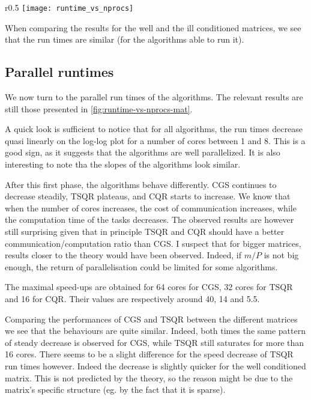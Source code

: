 \documentclass[a4paper, 12pt,oneside]{article}
\begin{document}
		\begin{wrapfigure}[30]{r}{0.5\textwidth}
			\centering
			\vspace{-1.5em}
			\texttt{[image: runtime\_vs\_nprocs]}
			\caption{Run times for the considered algorithms, and for both well and ill conditioned matrices.}
			\label{fig:runtime-vs-nprocs-mat}
		\end{wrapfigure}
		When comparing the results for the well and the ill conditioned matrices, we see that the run times are similar (for the algorithms able to run it). 
		\subsection{Parallel runtimes}
		We now turn to the parallel run times of the algorithms. The relevant results are still those presented in \ref{fig:runtime-vs-nprocs-mat}.

		A quick look is sufficient to notice that for all algorithms, the run times decrease quasi linearly on the log-log plot for a number of cores between 1 and 8. This is a good sign, as it suggests that the algorithms are well parallelized. It is also interesting to note tha the slopes of the algorithms look similar.
		
		After this first phase, the algorithms behave differently. CGS continues to decrease steadily, TSQR plateaus, and CQR starts to increase. We know that when the number of cores increases, the cost of communication increases, while the computation time of the tasks decreases. The observed results are however still surprising given that in principle TSQR and CQR should have a better communication/computation ratio than CGS. I suspect that for bigger matrices, results closer to the theory would have been observed. Indeed, if $m/P$ is not big enough, the return of parallelisation could be limited for some algorithms.

		The maximal speed-ups are obtained for 64 cores for CGS, 32 cores for TSQR and 16 for CQR. Their values are respectively around 40, 14 and 5.5.

		Comparing the performances of CGS and TSQR between the different matrices we see that the behaviours are quite similar. Indeed, both times the same pattern of steady decrease is observed for CGS, while TSQR still saturates for more than 16 cores. There seems to be a slight difference for the speed decrease of TSQR run times however. Indeed the decrease is slightly quicker for the well conditioned matrix. This is not predicted by the theory, so the reason might be due to the matrix's specific structure (eg. by the fact that it is sparse). 
\end{document}
